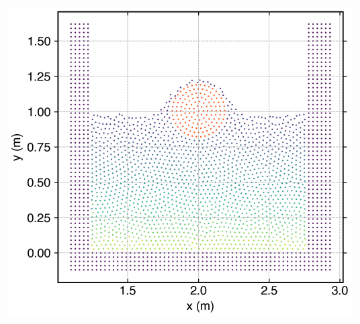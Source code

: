 \begin{figure}[!htpb]
\begin{subfigure}{0.48\textwidth}
    \includegraphics[width=1.0\textwidth]{figures/rfc/figures/dinesh_2022_body_in_hs_tank_2d/time4}
  \end{subfigure}


\end{figure}
